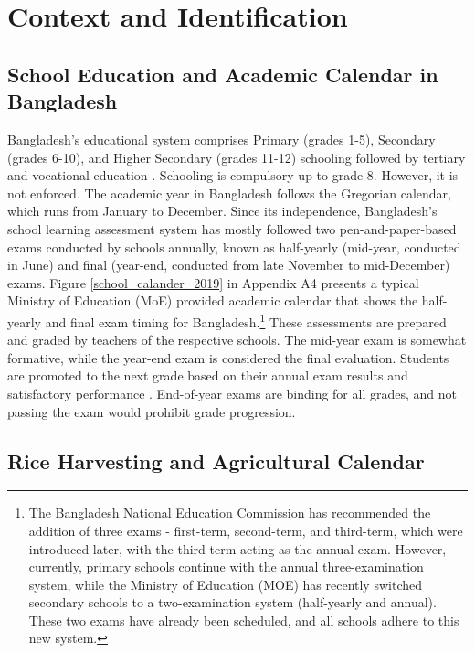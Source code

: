 \documentclass[12pt,letterpaper]{article}
\newcommand{\0}{\ensuremath{\mbox{\boldmath $0$}}}
\begin{document}
\section{Context and Identification\label{sec.id}}
\subsection{School Education and Academic Calendar in Bangladesh}

Bangladesh's educational system comprises Primary (grades 1-5), Secondary (grades 6-10), and Higher Secondary (grades 11-12) schooling followed by tertiary and vocational education \citep{kono2018primary}. Schooling is compulsory up to grade 8. However, it is not enforced. The academic year in Bangladesh follows the Gregorian calendar, which runs from January to December. Since its independence, Bangladesh's school learning assessment system has mostly followed two pen-and-paper-based exams conducted by schools annually, known as half-yearly (mid-year, conducted in June) and final (year-end, conducted from late November to mid-December) exams. Figure \ref{school_calander_2019} in Appendix A4 presents a typical Ministry of Education (MoE) provided academic calendar that shows the half-yearly and final exam timing for Bangladesh.\footnote{The Bangladesh National Education Commission has recommended the addition of three exams - first-term, second-term, and third-term, which were introduced later, with the third term acting as the annual exam. However, currently, primary schools continue with the annual three-examination system, while the Ministry of Education (MOE) has recently switched secondary schools to a two-examination system (half-yearly and annual). These two exams have already been scheduled, and all schools adhere to this new system.} These assessments are prepared and graded by teachers of the respective schools. The mid-year exam is somewhat formative, while the year-end exam is considered the final evaluation. Students are promoted to the next grade based on their annual exam results and satisfactory performance \citep{zhongming2017innovative}. End-of-year exams are binding for all grades, and not passing the exam would prohibit grade progression. 

\subsection{Rice Harvesting and Agricultural Calendar \label{sec.rice}}
\end{document}
